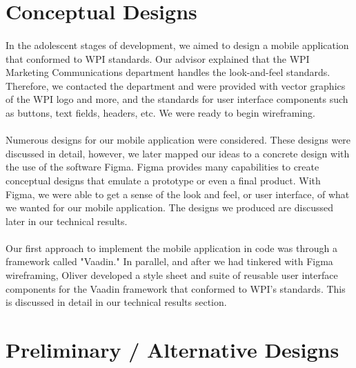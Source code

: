     
    \section{Conceptual Designs}
    \paragraph{}
    In the adolescent stages of development, we aimed to design a mobile application that conformed to WPI standards. Our advisor explained that the WPI Marketing Communications department handles the look-and-feel standards. Therefore, we contacted the department and were provided with vector graphics of the WPI logo and more, and the standards for user interface components such as buttons, text fields, headers, etc. We were ready to begin wireframing.
    \paragraph{}
    Numerous designs for our mobile application were considered. These designs were discussed in detail, however, we later mapped our ideas to a concrete design with the use of the software Figma. Figma provides many capabilities to create conceptual designs that emulate a prototype or even a final product. With Figma, we were able to get a sense of the look and feel, or user interface, of what we wanted for our mobile application. The designs we produced are discussed later in our technical results.
    \paragraph{}
    Our first approach to implement the mobile application in code was through a framework called "Vaadin." In parallel, and after we had tinkered with Figma wireframing, Oliver developed a style sheet and suite of reusable user interface components for the Vaadin framework that conformed to WPI's standards. This is discussed in detail in our technical results section.
    \newpage
    
    
    \section{Preliminary / Alternative Designs}

